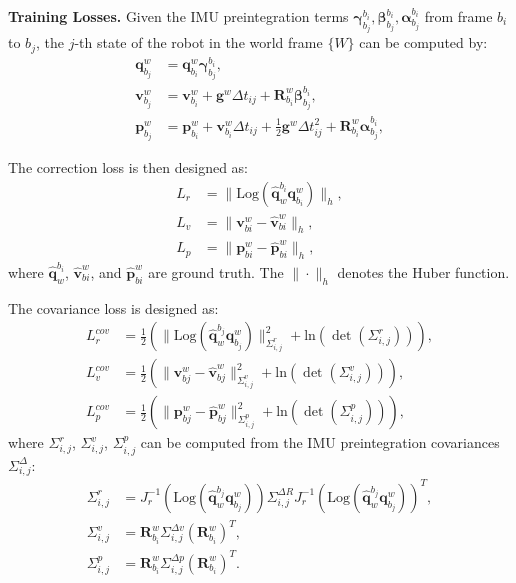 \noindent\textbf{Training Losses.} Given the IMU preintegration terms $\bm{\gamma}^{b_i}_{b_j}, \bm{\beta}^{b_i}_{b_j}, \bm{\alpha}^{b_i}_{b_j}$ from frame $b_i$ to $b_j$, the $j$-th state of the robot in the world frame $\{W\}$ can be computed by:
\begin{equation}
\label{eq:maci2:world_inte}
\begin{aligned}
\mathbf{q}^{w}_{b_j} &= \mathbf{q}^{w}_{b_i} \bm{\gamma}_{b_j}^{b_i}, \\
\mathbf{v}_{b_j}^{w} &= \mathbf{v}_{b_i}^{w} + \mathbf{g}^{w} \Delta t_{ij} + \mathbf{R}^{w}_{b_i} \bm{\beta}_{b_j}^{b_i}, \\
\mathbf{p}^{w}_{b_{j}} &= \mathbf{p}^{w}_{b_i} + \mathbf{v}^{w}_{b_i} \Delta t_{ij} + \frac{1}{2} \mathbf{g}^{w} \Delta t_{ij}^2 + \mathbf{R}^{w}_{b_i} \bm{\alpha}_{b_j}^{b_i},
\end{aligned}
\end{equation}

The correction loss is then designed as:
\begin{equation}
\begin{aligned}
L_r &= \| \text{Log}(\hat{\mathbf{q}}_w^{b_i} \mathbf{q}^w_{b_i}) \|_h, \\
L_v  &= \| \mathbf{v}^{w}_{bi}-\hat{\mathbf{v}}^{w}_{bi} \|_h, \\
L_p  &= \| \mathbf{p}^{w}_{bi}-\hat{\mathbf{p}}^{w}_{bi} \|_h,
\end{aligned}
\end{equation}
where $\hat{\mathbf{q}}_w^{b_i}$, $\hat{\mathbf{v}}^{w}_{bi}$, and $\hat{\mathbf{p}}^{w}_{bi}$ are ground truth. The $\|\cdot\|_h$ denotes the Huber function.

The covariance loss is designed as:
\begin{equation}
\begin{aligned}
L_r^{cov} &=\frac{1}{2} (\| \text{Log}(\hat{\mathbf{q}}_w^{b_j} \mathbf{q}^w_{b_j}) \|^2_{\Sigma^r_{i,j}} + \text{ln}(\det(\Sigma^r_{i,j}))),\\
L_v^{cov}  &= \frac{1}{2} (\| \mathbf{v}^{w}_{bj}-\hat{\mathbf{v}}^{w}_{bj} \|^2_{\Sigma^v_{i,j}} + \text{ln}(\det(\Sigma^v_{i,j}))), \\
L_p^{cov}  &= \frac{1}{2} (\| \mathbf{p}^{w}_{bj}-\hat{\mathbf{p}}^{w}_{bj} \|^2_{\Sigma^p_{i,j}} + \text{ln}(\det(\Sigma^p_{i,j}))),
\end{aligned}
\end{equation}
where $\Sigma^r_{i,j}$, $\Sigma^v_{i,j}$, $\Sigma^p_{i,j}$ can be computed from the IMU preintegration covariances $\Sigma^{\Delta}_{i,j}$:
\begin{equation}
\begin{aligned}
\Sigma^r_{i,j} &= J_r^{-1}(\text{Log}(\hat{\mathbf{q}}_w^{b_j} \mathbf{q}^w_{b_j})) \Sigma^{\Delta R}_{i,j} J_r^{-1}(\text{Log}(\hat{\mathbf{q}}_w^{b_j} \mathbf{q}^w_{b_j}))^T, \\
\Sigma^v_{i,j} &= \mathbf{R}^w_{b_i} \Sigma^{\Delta v}_{i,j} (\mathbf{R}^w_{b_i})^T, \\
\Sigma^p_{i,j} &= \mathbf{R}^w_{b_i} \Sigma^{\Delta p}_{i,j} (\mathbf{R}^w_{b_i})^T.
\end{aligned}
\end{equation}



